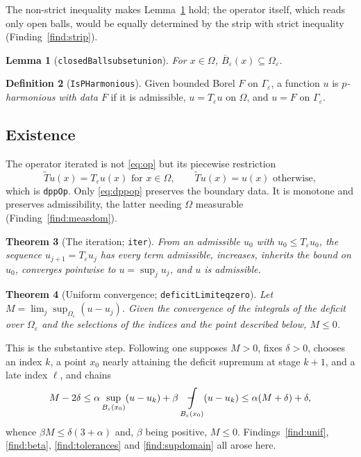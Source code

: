 \documentclass[11pt,reqno]{amsart}
\newcommand{\fint}{\mathop{\mathrlap{\,\rule[0.62ex]{0.62em}{0.5pt}}\int}}
\newcommand{\LEANREF}[1]{\texttt{\small\def\_{\textunderscore\allowbreak}#1}}
\newcommand{\eps}{\varepsilon}
\newcommand{\Op}{T_\eps}
\newcommand{\avgint}{\fint}
\theoremstyle{plain}
\newtheorem{theorem}{Theorem}[section]
\newtheorem{lemma}[theorem]{Lemma}
\theoremstyle{definition}
\newtheorem{definition}[theorem]{Definition}
\begin{document}
The non-strict inequality makes Lemma~\ref{lem:closed} hold; the operator
itself, which reads only open balls, would be equally determined by the strip
with strict inequality (Finding~\ref{find:strip}).

\begin{lemma}[\LEANREF{closedBall\_subset\_union}]\label{lem:closed}
For $x \in \Omega$, $\overline{B}_\eps(x) \subseteq \Omega_\eps$.
\end{lemma}

\begin{definition}[\LEANREF{IsPHarmonious}]\label{def:pharm}
Given bounded Borel $F$ on $\Gamma_\eps$, a function $u$ is
\emph{$p$-harmonious with data $F$} if it is admissible, $u = \Op u$ on
$\Omega$, and $u = F$ on $\Gamma_\eps$.
\end{definition}

\subsection{Existence}\label{ssec:existence}

The operator iterated is not \eqref{eq:op} but its piecewise restriction
\begin{equation}\label{eq:dppop}
  \widetilde T u(x) = \Op u(x) \text{ for } x \in \Omega, \qquad
  \widetilde T u(x) = u(x) \text{ otherwise},
\end{equation}
which is \LEANREF{dppOp}. Only \eqref{eq:dppop} preserves the boundary data.
It is monotone and preserves admissibility, the latter needing $\Omega$
measurable (Finding~\ref{find:measdom}).

\begin{theorem}[The iteration; \LEANREF{iter}]\label{thm:iteration}
From an admissible $u_0$ with $u_0 \le \Op u_0$, the sequence
$u_{j+1} = \Op u_j$ has every term admissible, increases, inherits the bound on
$u_0$, converges pointwise to $u = \sup_j u_j$, and $u$ is admissible.
\end{theorem}

\begin{theorem}[Uniform convergence;
\LEANREF{deficitLimit\_eq\_zero}]\label{thm:unifconv}
Let $M = \lim_j \sup_{\Omega_\eps}(u - u_j)$. Given the convergence of the
integrals of the deficit over $\Omega_\eps$ and the selections of the indices
and the point described below, $M \le 0$.
\end{theorem}

This is the substantive step. Following \cite[Thm.~2.1]{LPS14} one supposes
$M>0$, fixes $\delta>0$, chooses an index $k$, a point $x_0$ nearly attaining
the deficit supremum at stage $k+1$, and a late index $\ell$, and chains
\[
  M - 2\delta \le \alpha \sup_{B_\eps(x_0)}(u - u_k)
    + \beta \avgint_{B_\eps(x_0)}(u - u_k)
  \le \alpha(M+\delta) + \delta,
\]
whence $\beta M \le \delta(3+\alpha)$ and, $\beta$ being positive, $M \le 0$.
Findings~\ref{find:unif}, \ref{find:beta}, \ref{find:tolerances} and
\ref{find:supdomain} all arose here.
\end{document}
